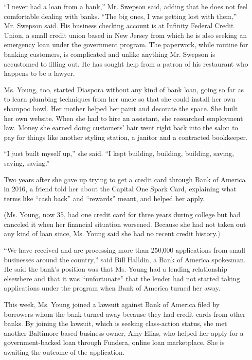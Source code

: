 ``I never had a loan from a bank,'' Mr. Swepson said, adding that he
does not feel comfortable dealing with banks. ``The big ones, I was
getting lost with them,'' Mr. Swepson said. His business checking
account is at Infinity Federal Credit Union, a small credit union based
in New Jersey from which he is also seeking an emergency loan under the
government program. The paperwork, while routine for banking customers,
is complicated and unlike anything Mr. Swepson is accustomed to filling
out. He has sought help from a patron of his restaurant who happens to
be a lawyer.

Ms. Young, too, started Diaspora without any kind of bank loan, going so
far as to learn plumbing techniques from her uncle so that she could
install her own shampoo bowl. Her mother helped her paint and decorate
the space. She built her own website. When she had to hire an assistant,
she researched employment law. Money she earned doing customers' hair
went right back into the salon to pay for things like another styling
station, a janitor and a contracted bookkeeper.

``I just built myself up,'' she said. ``I kept building, building,
building, saving, saving, saving.''

Two years after she gave up trying to get a credit card through Bank of
America in 2016, a friend told her about the Capital One Spark Card,
explaining what terms like ``cash back'' and ``rewards'' meant, and
helped her apply.

(Ms. Young, now 35, had one credit card for three years during college
but had canceled it when her financial situation worsened. Because she
had not taken out any kind of loan since, Ms. Young said she had no
recent credit history.)

``We have received and are processing more than 250,000 applications
from small businesses around the country,'' said Bill Halldin, a Bank of
America spokesman. He said the bank's position was that Ms. Young had a
lending relationship elsewhere and that it was ``unfortunate'' that the
lender had not started taking applications under the program when Bank
of America turned her away.

This week, Ms. Young joined a lawsuit against Bank of America filed by
borrowers whom the bank turned away because they had credit cards from
other banks. By joining the lawsuit, which is seeking class-action
status, she met another Baltimore-based business owner, Amy Elias, who
helped her apply for a government-backed loan through Fundera, online
loan marketplace. She is awaiting the outcome of the application.


